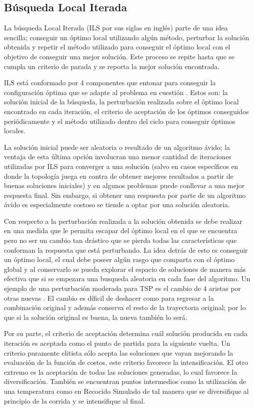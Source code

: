 \documentclass{ci5652}
\begin{document}
\subsection{Búsqueda Local Iterada}

La búsqueda Local Iterada (ILS por sus siglas en inglés) parte de una idea sencilla; conseguir un óptimo local utilizando algún método, perturbar la solución obtenida y repetir el método utilizado para conseguir el óptimo local con el objetivo de conseguir una mejor solución. Este proceso se repite hasta que se cumpla un criterio de parada y se reporta la mejor solución encontrada.

ILS está conformado por 4 componentes que entonar para conseguir la configuración óptima que se adapte al problema en cuestión \cite{9}. Estos son: la solución inicial de la búsqueda, la perturbación realizada sobre el óptimo local encontrado en cada iteración, el criterio de aceptación de los óptimos conseguidos periódicamente y el método utilizado dentro del ciclo para conseguir óptimos locales.

La solución inicial puede ser aleatoria o resultado de un algoritmo ávido; la ventaja de esta última opción involucran una menor cantidad de iteraciones utilizadas por ILS para converger a una solución (salvo en casos específicos en donde la topología juega en contra de obtener mejores resultados a partir de buenas soluciones iniciales) y en algunos problemas puede conllevar a una mejor respuesta final. Sin embargo, si obtener una respuesta por parte de un algoritmo ávido es especialmente costoso se tiende a optar por una solución aleatoria.

Con respecto a la perturbación realizada a la solución obtenida se debe realizar en una medida que le permita escapar del óptimo local en el que se encuentra pero no ser un cambio tan drástico que se pierda todas las características que conforman la respuesta que está perturbando. La idea detrás de esto es conseguir un óptimo local, el cual debe poseer algún rasgo que comparta con el óptimo global y al conservarlo se pueda explorar el espacio de soluciones de manera más efectiva que si se empezara una busqueda aleatoria en cada fase del algoritmo. Un ejemplo de una perturbación moderada para TSP es el cambio de 4 aristas por otras nuevas \cite{9}. El cambio es díficil de deshacer como para regresar a la combinación original y además conserva el resto de la trayectoria original; por lo que si la solución original es buena, la nueva también lo será.

Por su parte, el criterio de aceptación determina cuál solución producida en cada iteración es aceptada como el punto de partida para la siguiente vuelta. Un criterio puramente elitista sólo acepta las soluciones que vayan mejorando la evaluación de la función de costos, este criterio favorece la intensificación. El otro extremo es la aceptación de todas las soluciones generadas, lo cual favorece la diversificación. También se encuentran puntos intermedios como la utilización de una temperatura como en Recocido Simulado de tal manera que se diversifique al principio de la corrida y se intensifique al final.
\end{document}
